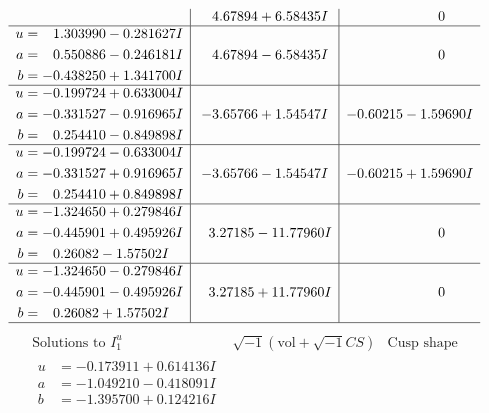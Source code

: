 \documentclass[1p]{elsarticle_modified}
\theoremstyle{definition}
\newcommand{\I}{\sqrt{-1}}
\begin{document}
$$\begin{array}{c|c|c}
 & \phantom{-}4.67894 + 6.58435 I & \phantom{-0.000000 } 0 \\ \hline\begin{aligned}
u &= \phantom{-}1.303990 - 0.281627 I \\
a &= \phantom{-}0.550886 - 0.246181 I \\
b &= -0.438250 + 1.341700 I\end{aligned}
 & \phantom{-}4.67894 - 6.58435 I & \phantom{-0.000000 } 0 \\ \hline\begin{aligned}
u &= -0.199724 + 0.633004 I \\
a &= -0.331527 - 0.916965 I \\
b &= \phantom{-}0.254410 - 0.849898 I\end{aligned}
 & -3.65766 + 1.54547 I & -0.60215 - 1.59690 I \\ \hline\begin{aligned}
u &= -0.199724 - 0.633004 I \\
a &= -0.331527 + 0.916965 I \\
b &= \phantom{-}0.254410 + 0.849898 I\end{aligned}
 & -3.65766 - 1.54547 I & -0.60215 + 1.59690 I \\ \hline\begin{aligned}
u &= -1.324650 + 0.279846 I \\
a &= -0.445901 + 0.495926 I \\
b &= \phantom{-}0.26082 - 1.57502 I\end{aligned}
 & \phantom{-}3.27185 - 11.77960 I & \phantom{-0.000000 } 0 \\ \hline\begin{aligned}
u &= -1.324650 - 0.279846 I \\
a &= -0.445901 - 0.495926 I \\
b &= \phantom{-}0.26082 + 1.57502 I\end{aligned}
 & \phantom{-}3.27185 + 11.77960 I & \phantom{-0.000000 } 0\\
 \hline 
 \end{array}$$\newpage$$\begin{array}{c|c|c}  
\text{Solutions to }I^u_{1}& \I (\text{vol} + \sqrt{-1}CS) & \text{Cusp shape}\\
 \hline 
\begin{aligned}
u &= -0.173911 + 0.614136 I \\
a &= -1.049210 - 0.418091 I \\
b &= -1.395700 + 0.124216 I\end{aligned}

\end{array}$$
\end{document}
